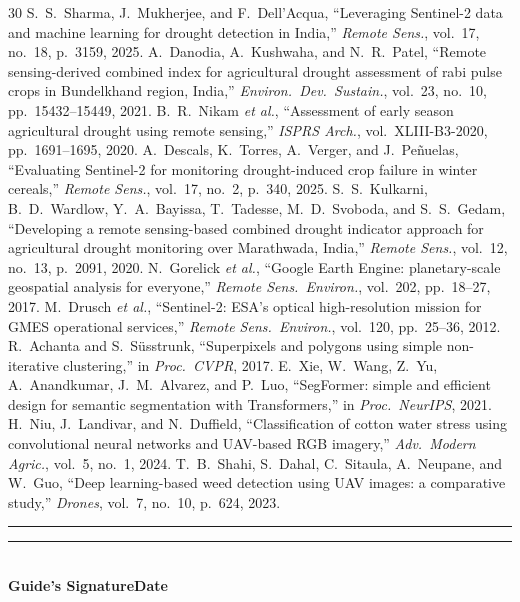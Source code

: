 \documentclass[11pt,a4paper,oneside]{article}
\begin{document}
\begin{thebibliography}{30}
 S.~S.~Sharma, J.~Mukherjee, and F.~Dell'Acqua, ``Leveraging Sentinel-2 data and machine learning for drought detection in India,'' \textit{Remote Sens.}, vol.~17, no.~18, p.~3159, 2025.
 A.~Danodia, A.~Kushwaha, and N.~R.~Patel, ``Remote sensing-derived combined index for agricultural drought assessment of rabi pulse crops in Bundelkhand region, India,'' \textit{Environ.\ Dev.\ Sustain.}, vol.~23, no.~10, pp.~15432--15449, 2021.
 B.~R.~Nikam \textit{et al.}, ``Assessment of early season agricultural drought using remote sensing,'' \textit{ISPRS Arch.}, vol.~XLIII-B3-2020, pp.~1691--1695, 2020.
 A.~Descals, K.~Torres, A.~Verger, and J.~Pe\~{n}uelas, ``Evaluating Sentinel-2 for monitoring drought-induced crop failure in winter cereals,'' \textit{Remote Sens.}, vol.~17, no.~2, p.~340, 2025.
 S.~S.~Kulkarni, B.~D.~Wardlow, Y.~A.~Bayissa, T.~Tadesse, M.~D.~Svoboda, and S.~S.~Gedam, ``Developing a remote sensing-based combined drought indicator approach for agricultural drought monitoring over Marathwada, India,'' \textit{Remote Sens.}, vol.~12, no.~13, p.~2091, 2020.
 N.~Gorelick \textit{et al.}, ``Google Earth Engine: planetary-scale geospatial analysis for everyone,'' \textit{Remote Sens.\ Environ.}, vol.~202, pp.~18--27, 2017.
 M.~Drusch \textit{et al.}, ``Sentinel-2: ESA's optical high-resolution mission for GMES operational services,'' \textit{Remote Sens.\ Environ.}, vol.~120, pp.~25--36, 2012.
 R.~Achanta and S.~S\"{u}sstrunk, ``Superpixels and polygons using simple non-iterative clustering,'' in \textit{Proc.\ CVPR}, 2017.
 E.~Xie, W.~Wang, Z.~Yu, A.~Anandkumar, J.~M.~Alvarez, and P.~Luo, ``SegFormer: simple and efficient design for semantic segmentation with Transformers,'' in \textit{Proc.\ NeurIPS}, 2021.
 H.~Niu, J.~Landivar, and N.~Duffield, ``Classification of cotton water stress using convolutional neural networks and UAV-based RGB imagery,'' \textit{Adv.\ Modern Agric.}, vol.~5, no.~1, 2024.
 T.~B.~Shahi, S.~Dahal, C.~Sitaula, A.~Neupane, and W.~Guo, ``Deep learning-based weed detection using UAV images: a comparative study,'' \textit{Drones}, vol.~7, no.~10, p.~624, 2023.
\end{thebibliography}
\endgroup

\vspace{8pt}
\noindent\rule{0.38\textwidth}{0.4pt}\hfill\rule{0.28\textwidth}{0.4pt}\\[2pt]
\noindent\textbf{Guide's Signature}\hfill\textbf{Date}
\end{document}
